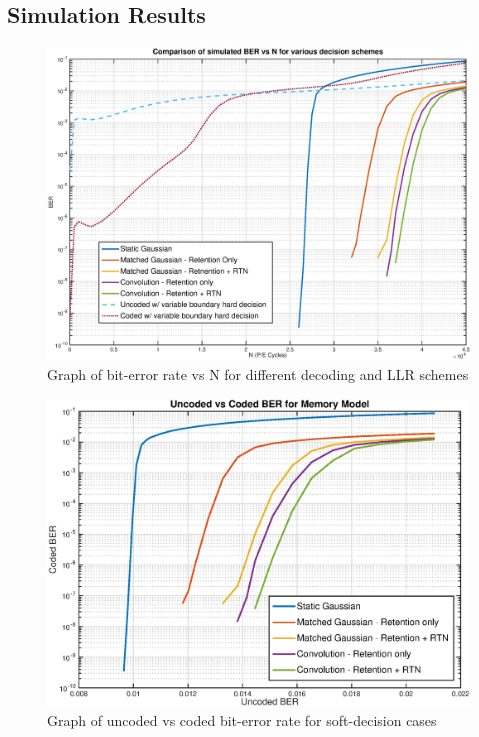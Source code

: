 \documentclass[11pt]{article}
\numberwithin{equation}{subsection}
\begin{document}
\subsection{Simulation Results}
\begin{figure}[ht]
\centering
\includegraphics[scale=0.52]{codedBER_NCycles}
\caption{Graph of bit-error rate vs N for different decoding and LLR schemes}
\label{fig:memory_results_graph}
\end{figure}
\begin{figure}[ht]
\centering
\includegraphics[scale=0.75]{cber_uber_memory}
\caption{Graph of uncoded vs coded bit-error rate for soft-decision cases}
\label{fig:memory_results_graph2}
\end{figure}
\end{document}
